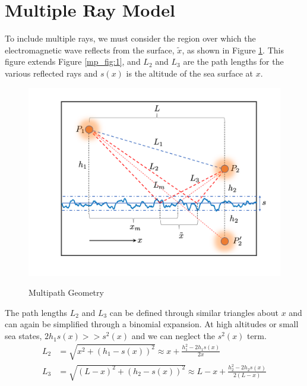 \section{Multiple Ray Model}
To include multiple rays, we must consider the region over which the electromagnetic wave reflects from the surface, $\tilde{x}$, as shown in Figure \ref{mp_fig:2}. This figure extends Figure \ref{mp_fig:1}, and  $L_2$ and $L_3$ are the path lengths for the various reflected rays and $s(x)$ is the altitude of the sea surface at $x$. 

\begin{figure}[H]
  \begin{center}
\includegraphics[width=5in]{../media/analysis/multipath_layout.png}
  \end{center}
  \renewcommand{\baselinestretch}{1} \small\normalsize
  \begin{quote}
    \caption[Multipath Geometry with Random ]{ Multipath Geometry\label{mp_fig:2}}
  \end{quote}
\end{figure}
\renewcommand{\baselinestretch}{2} \small\normalsize


The path lengths  $L_2$ and $L_3$ can be defined through similar triangles about $x$ and can again be simplified through a binomial expansion. At high altitudes or small sea states, $2h_1s(x) >> s^2(x)$ and we can neglect the $s^2(x)$ term.
\begin{equation}
\begin{aligned}
L_2 &= \sqrt{x^2 + \left( h_1 - s(x)\right)^2}  \approx x + \frac{h_1^2-2h_1s(x)}{2x}\\
L_3 & = \sqrt{\left(L - x\right)^2 + \left( h_2 - s(x)\right)^2}  \approx L-x + \frac{h_2^2 - 2h_2s(x)}{2\left(L-x\right)}\\
\end{aligned}
\label{mp_eq:12}
\end{equation}
\renewcommand{\baselinestretch}{2} \small\normalsize

